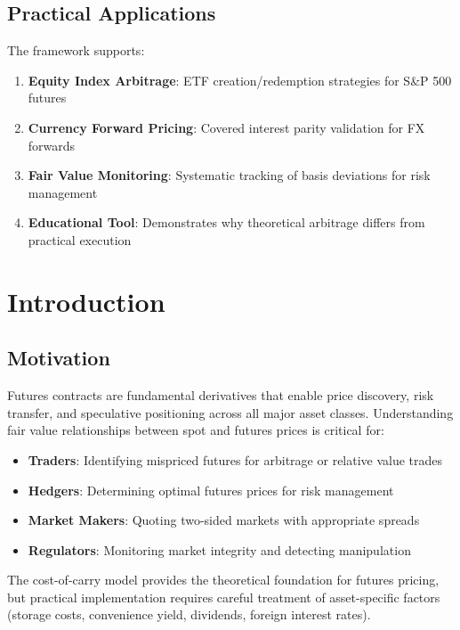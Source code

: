 \documentclass[12pt,a4paper]{article}
\begin{document}
\subsection{Practical Applications}

The framework supports:
\begin{enumerate}
    \item \textbf{Equity Index Arbitrage}: ETF creation/redemption strategies for S\&P 500 futures
    \item \textbf{Currency Forward Pricing}: Covered interest parity validation for FX forwards
    \item \textbf{Fair Value Monitoring}: Systematic tracking of basis deviations for risk management
    \item \textbf{Educational Tool}: Demonstrates why theoretical arbitrage differs from practical execution
\end{enumerate}

\newpage
\section{Introduction}

\subsection{Motivation}

Futures contracts are fundamental derivatives that enable price discovery, risk transfer, and speculative positioning across all major asset classes. Understanding fair value relationships between spot and futures prices is critical for:

\begin{itemize}
    \item \textbf{Traders}: Identifying mispriced futures for arbitrage or relative value trades
    \item \textbf{Hedgers}: Determining optimal futures prices for risk management
    \item \textbf{Market Makers}: Quoting two-sided markets with appropriate spreads
    \item \textbf{Regulators}: Monitoring market integrity and detecting manipulation
\end{itemize}

The cost-of-carry model provides the theoretical foundation for futures pricing, but practical implementation requires careful treatment of asset-specific factors (storage costs, convenience yield, dividends, foreign interest rates).
\end{document}
